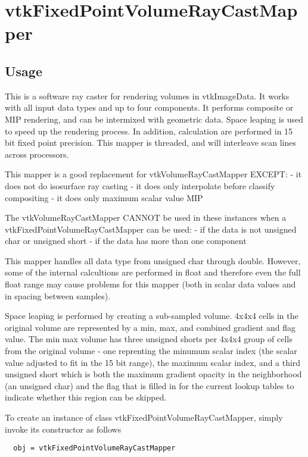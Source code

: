 \section{vtkFixedPointVolumeRayCastMapper}

\subsection{Usage}

 This is a software ray caster for rendering volumes in vtkImageData. 
 It works with all input data types and up to four components. It performs
 composite or MIP rendering, and can be intermixed with geometric data.
 Space leaping is used to speed up the rendering process. In addition,
 calculation are performed in 15 bit fixed point precision. This mapper
 is threaded, and will interleave scan lines across processors.

 This mapper is a good replacement for vtkVolumeRayCastMapper EXCEPT:
   - it does not do isosurface ray casting
   - it does only interpolate before classify compositing
   - it does only maximum scalar value MIP

 The vtkVolumeRayCastMapper CANNOT be used in these instances when a
 vtkFixedPointVolumeRayCastMapper can be used:
   - if the data is not unsigned char or unsigned short
   - if the data has more than one component

 This mapper handles all data type from unsigned char through double.
 However, some of the internal calcultions are performed in float and
 therefore even the full float range may cause problems for this mapper
 (both in scalar data values and in spacing between samples). 

 Space leaping is performed by creating a sub-sampled volume. 4x4x4 
 cells in the original volume are represented by a min, max, and 
 combined gradient and flag value. The min max volume has three 
 unsigned shorts per 4x4x4 group of cells from the original volume -
 one reprenting the minumum scalar index (the scalar value adjusted
 to fit in the 15 bit range), the maximum scalar index, and a 
 third unsigned short which is both the maximum gradient opacity in
 the neighborhood (an unsigned char) and the flag that is filled
 in for the current lookup tables to indicate whether this region
 can be skipped.

To create an instance of class vtkFixedPointVolumeRayCastMapper, simply
invoke its constructor as follows
\begin{verbatim}
  obj = vtkFixedPointVolumeRayCastMapper
\end{verbatim}
